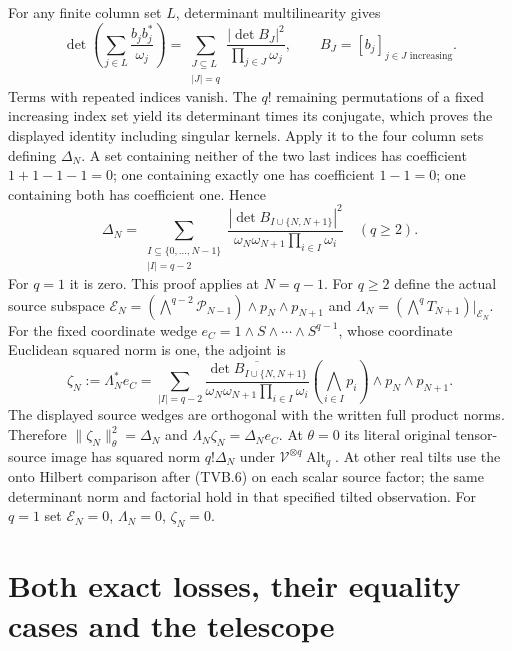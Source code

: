 \documentclass[11pt]{article}
\newcommand{\Alt}{\operatorname{Alt}}
\begin{document}
For any finite column set $L$, determinant multilinearity gives
\[
 \det\left(\sum_{j\in L}\frac{b_jb_j^*}{\omega_j}\right)
 =\sum_{\substack{J\subseteq L\\|J|=q}}
       \frac{|\det B_J|^2}{\prod_{j\in J}\omega_j},
 \qquad B_J=[b_j]_{j\in J\text{ increasing}}.
\]
Terms with repeated indices vanish. The $q!$ remaining
permutations of a fixed increasing index set yield its determinant
times its conjugate, which proves the displayed identity including
singular kernels. Apply it to the four column sets defining
$\Delta_N$. A set containing neither of the two last indices has
coefficient $1+1-1-1=0$; one containing exactly one has coefficient
$1-1=0$; one containing both has coefficient one. Hence
\[
 \Delta_N=
 \sum_{\substack{I\subseteq\{0,\ldots,N-1\}\\|I|=q-2}}
 \frac{|\det B_{I\cup\{N,N+1\}}|^2}
      {\omega_N\omega_{N+1}\prod_{i\in I}\omega_i}
 \quad(q\ge2).
 \tag{TVB.30}
\]
For $q=1$ it is zero. This proof applies at $N=q-1$.
For $q\ge2$ define the actual source subspace
$\mathcal E_N=(\bigwedge^{q-2}\mathcal P_{N-1})\wedge p_N\wedge p_{N+1}$
and $\Lambda_N=(\bigwedge^qT_{N+1})|_{\mathcal E_N}$.
For the fixed coordinate wedge $e_C=1\wedge S\wedge\cdots\wedge S^{q-1}$,
whose coordinate Euclidean squared norm is one, the adjoint is
\[
 \zeta_N:=\Lambda_N^*e_C
 =\sum_{|I|=q-2}
 \frac{\overline{\det B_{I\cup\{N,N+1\}}}}
      {\omega_N\omega_{N+1}\prod_{i\in I}\omega_i}
 \left(\bigwedge_{i\in I}p_i\right)\wedge p_N\wedge p_{N+1}.
 \tag{TVB.31}
\]
The displayed source wedges are orthogonal with the written full
product norms. Therefore
$\|\zeta_N\|_\theta^2=\Delta_N$ and
$\Lambda_N\zeta_N=\Delta_Ne_C$.
At $\theta=0$ its literal original tensor-source image has squared
norm $q!\Delta_N$ under $\mathcal V^{\otimes q}\Alt_q$.
At other real tilts use the onto Hilbert comparison after (TVB.6)
on each scalar source factor; the same determinant norm and factorial
hold in that specified tilted observation. For $q=1$ set
$\mathcal E_N=0$, $\Lambda_N=0$, $\zeta_N=0$.

\section{Both exact losses, their equality cases and the telescope}
\end{document}
